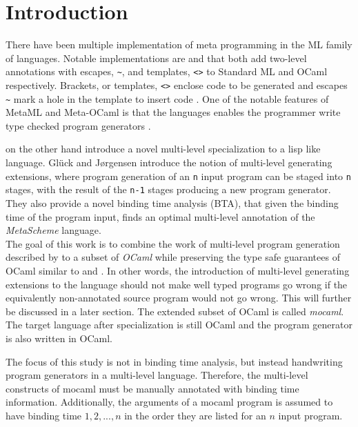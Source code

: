 
\section{Introduction}
There have been multiple implementation of meta programming in the ML family of languages. Notable implementations are \cite{metaML} and \cite{metaOCaml} that both add two-level annotations with escapes, \texttt{\~}, and templates, \texttt{<>} to Standard ML and OCaml respectively. Brackets, or templates, \texttt{<>} enclose code to be generated and escapes \texttt{\~} mark a hole in the template to insert code \cite{metaOCaml}. One of the notable features of MetaML and Meta-OCaml is that the languages enables the programmer write type checked program generators \cite{metaOCaml}.

\cite{multilevel} on the other hand introduce a novel multi-level specialization
to a lisp like language. Glück and Jørgensen introduce the notion of multi-level generating extensions, where program generation of an \texttt{n} input program can be staged into \texttt{n} stages, with the result of the \texttt{n-1} stages producing a new program generator. They also provide a novel binding time analysis (BTA), that given the binding time of the program input, finds an optimal multi-level annotation of the \textit{MetaScheme} language.\\

The goal of this work is to combine the work of multi-level program generation described by \cite{multilevel} to a subset of \textit{OCaml} while preserving the type safe guarantees of OCaml similar to \cite{metaOCaml} and \cite{metaML}. In other words, the introduction of multi-level generating extensions to the language should not make well typed programs go wrong if the equivalently non-annotated source program would not go wrong. This will further be discussed in a later section. The extended subset of OCaml is called \textit{mocaml}. The target language after specialization is still OCaml and the program generator is also written in OCaml.

The focus of this study is not in binding time analysis, but instead handwriting program generators in a multi-level language. Therefore, the multi-level constructs of mocaml must be manually annotated with binding time information. Additionally, the arguments of a mocaml program is assumed to have binding time $1,2,...,n$ in the order they are listed for an $n$ input program.


